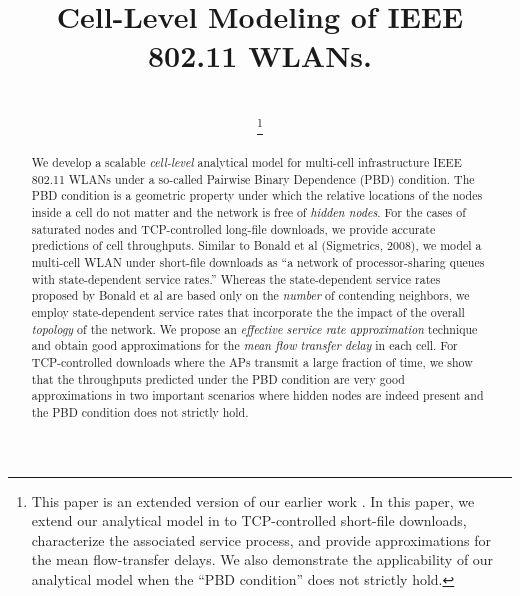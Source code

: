 \documentclass[10pt,a4paper,journal]{IEEEtran}
\theoremstyle{definition}
\theoremstyle{remark}
\theoremstyle{plain}
\begin{document}
\title{Cell-Level Modeling of IEEE 802.11 WLANs.} 


\author{ \\
\thanks{This paper is an extended
  version of our earlier work
  \cite{wanet.manoj-anuragRAWNET09multicell}. In this paper, we extend
  our analytical model in \cite{wanet.manoj-anuragRAWNET09multicell}
  to TCP-controlled short-file downloads, characterize the associated
  service process, and provide approximations for the mean flow-transfer
  delays. We also demonstrate the applicability of our analytical model 
  when the ``PBD condition'' does not strictly hold.}}

\maketitle


\begin{abstract}
We develop a scalable \textit{cell-level} analytical model for multi-cell infrastructure IEEE 802.11 WLANs under a so-called Pairwise Binary Dependence (PBD) condition. The PBD condition is a geometric property under which the relative locations of the nodes inside a cell do not matter and the network is free of \textit{hidden nodes}. For the cases of saturated nodes and TCP-controlled long-file downloads, we provide accurate predictions of cell throughputs. Similar to Bonald et al (Sigmetrics, 2008), we model a multi-cell WLAN under short-file downloads as ``a network of processor-sharing queues with state-dependent service rates.'' Whereas the state-dependent service rates proposed by Bonald et al are based only on the \textit{number} of contending neighbors, we employ state-dependent service rates that incorporate the the impact of the overall \textit{topology} of the network. We propose an \textit{effective service rate approximation} technique and obtain good approximations for the \textit{mean flow transfer delay} in each cell. For TCP-controlled downloads where the APs transmit a large fraction of time, we show that the throughputs predicted under the PBD condition are very good approximations in two important scenarios where hidden nodes are indeed present and the PBD condition does not strictly hold. 

\end{abstract}
\end{document}
